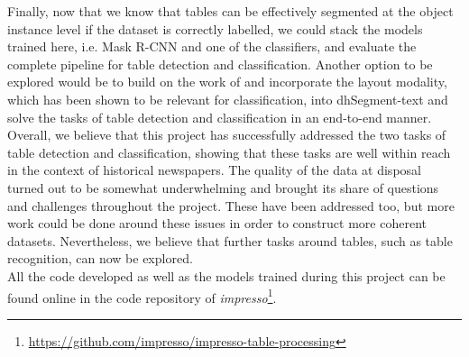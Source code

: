 Finally, now that we know that tables can be effectively segmented at the object instance level if the dataset is correctly labelled, we could stack the models trained here, i.e. Mask R-CNN and one of the classifiers, and evaluate the complete pipeline for table detection and classification. Another option to be explored would be to build on the work of \citet{barman_combining_2021} and incorporate the layout modality, which has been shown to be relevant for classification, into dhSegment-text and solve the tasks of table detection and classification in an end-to-end manner.\\
Overall, we believe that this project has successfully addressed the two tasks of table detection and classification, showing that these tasks are well within reach in the context of historical newspapers. The quality of the data at disposal turned out to be somewhat underwhelming and brought its share of questions and challenges throughout the project. These have been addressed too, but more work could be done around these issues in order to construct more coherent datasets. Nevertheless, we believe that further tasks around tables, such as table recognition, can now be explored. \\

All the code developed as well as the models trained during this project can be found online in the code repository of \textit{impresso}\footnote{\url{https://github.com/impresso/impresso-table-processing}}.
